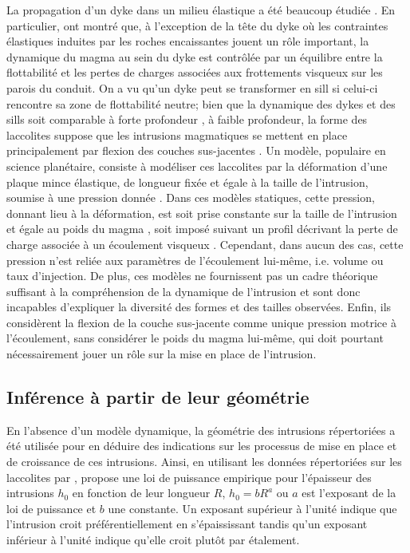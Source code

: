La  propagation d'un  dyke dans  un  milieu élastique  a été  beaucoup
étudiée    \citep{Lister:1991ut,Rubin:1995upa}.     En    particulier,
\citet{Lister:1991ut} ont montré que, à l'exception de la tête du dyke
où  les contraintes  élastiques induites  par les  roches encaissantes
jouent un  rôle important, la dynamique  du magma au sein  du dyke est
contrôlée  par un  équilibre entre  la flottabilité  et les  pertes de
charges associées aux frottements visqueux  sur les parois du conduit.
On a vu  qu'un dyke peut se transformer en  sill si celui-ci rencontre
sa zone de flottabilité neutre; bien que la dynamique des dykes et des
sills       soit       comparable       à       forte       profondeur
\citep{Lister:1991ut,Cruden:tg},  à faible  profondeur,  la forme  des
laccolites suppose que les intrusions  magmatiques se mettent en place
principalement     par     flexion    des     couches     sus-jacentes
\citep{Johnson:1973ho}.  Un  modèle, populaire en  science planétaire,
consiste à  modéliser ces laccolites  par la déformation  d'une plaque
mince  élastique,  de   longueur  fixée  et  égale  à   la  taille  de
l'intrusion,  soumise à  une  pression donnée  \citep{Pollard:1973ho}.
Dans  ces  modèles  statiques,  cette  pression,  donnant  lieu  à  la
déformation, est soit prise constante  sur la taille de l'intrusion et
égale             au             poids            du             magma
\citep{Pollard:1973ho,Wichman:1996bj,Jozwiak:2012dq},    soit   imposé
suivant  un  profil  décrivant  la  perte  de  charge  associée  à  un
écoulement visqueux \citep{Kerr:1998eo,Wohler:2009jj}. Cependant, dans
aucun  des  cas,  cette  pression   n’est  reliée  aux  paramètres  de
l’écoulement lui-même, i.e. volume ou  taux d’injection.  De plus, ces
modèles  ne  fournissent  pas  un   cadre  théorique  suffisant  à  la
compréhension de la  dynamique de l'intrusion et  sont donc incapables
d'expliquer la diversité  des formes et des  tailles observées. Enfin,
ils  considèrent la  flexion  de la  couche  sus-jacente comme  unique
pression motrice  à l'écoulement,  sans considérer  le poids  du magma
lui-même, qui doit  pourtant nécessairement jouer un rôle  sur la mise
en place de l'intrusion.

\subsection{Inférence à partir de leur géométrie}
\label{sec:empl-dynam-des}

En  l'absence  d'un  modèle  dynamique, la  géométrie  des  intrusions
répertoriées a  été utilisée pour  en déduire des indications  sur les
processus de mise en place et de croissance de ces intrusions.  Ainsi,
en  utilisant   les  données  répertoriées  sur   les  laccolites  par
\citet{E:2015tl},   \citet{McCaffrey:1997ea}   propose  une   loi   de
puissance empirique pour l'épaisseur  des intrusions $h_0$ en fonction
de leur longueur $R$, $h_0 = bR^a$  ou $a$ est l'exposant de la loi de
puissance  et $b$  une  constante.  Un  exposant  supérieur à  l'unité
indique  que l'intrusion  croit  préférentiellement en  s'épaississant
tandis qu'un exposant inférieur à l'unité indique qu'elle croit plutôt
par étalement.

